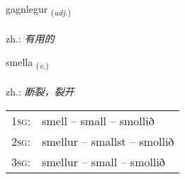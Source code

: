 \documentclass[frontgrid, backgrid]{flacards}\usepackage[]{graphicx}\usepackage[]{xcolor}
\begin{document}
\renewcommand{\blhead}{\vskip5pt {\small\bfseries\footnotesize Lýsingarorð | 形容词 }}
\renewcommand{\bcfoot}{\vskip5pt \hspace{2pt}{\small\bfseries\footnotesize 3K}}


{gagnlegur \small{\textsubscript{(\textit{adj.})}} \\[1ex] %
\textphonetic{[kaklɛɣʏr]} \\
zh.: \emph{有用的} \\  [2ex]
\renewcommand*{\arraystretch}{0.8}
}

\renewcommand{\flhead}{\vskip5pt \fboxsep=0pt {\small\bfseries\footnotesize Sagnorð | 动词}}
\renewcommand{\fcfoot}{\vskip5pt \fboxsep=0pt \hspace{2pt}{\small\bfseries\footnotesize 3K}}

\renewcommand{\blhead}{\vskip5pt {\small\bfseries\footnotesize Sagnorð | 动词 }}
\renewcommand{\bcfoot}{\vskip5pt \hspace{2pt}{\small\bfseries\footnotesize 3K}}


{smella \small{\textsubscript{(\textit{v.})}} \\[1ex] %
\textphonetic{[smɛtla]} \\
zh.: \emph{断裂，裂开} \\  [2ex]
\renewcommand*{\arraystretch}{0.8}
\begin{tabular}{p{1cm}l}
\textsc{1sg}: & smell -- small -- smollið \\ 
\textsc{2sg}: & smellur -- smallst -- smollið \\ 
\textsc{3sg}: & smellur -- small -- smollið \\ 
\end{tabular}
}
\end{document}
